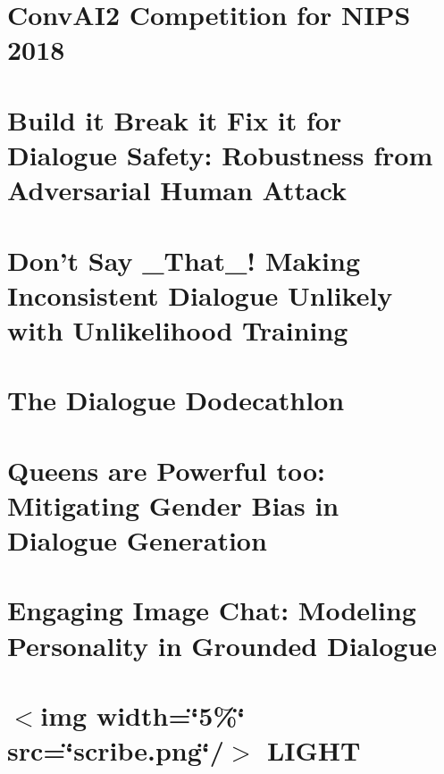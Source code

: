 \documentclass[twoside]{book}
\newcommand{\+}{\discretionary{\mbox{\scriptsize$\hookleftarrow$}}{}{}}
\begin{document}
\chapter{Conv\+A\+I2 Competition for N\+I\+PS 2018}
\label{md_projects_convai2_README}

\chapter{Build it Break it Fix it for Dialogue Safety\+: Robustness from Adversarial Human Attack}
\label{md_projects_dialogue_safety_README}

\chapter{Don’t Say \+\_\+\+That\+\_\+! Making Inconsistent Dialogue Unlikely with Unlikelihood Training}
\label{md_projects_dialogue_unlikelihood_README}

\chapter{The Dialogue Dodecathlon}
\label{md_projects_dodecadialogue_README}

\chapter{Queens are Powerful too\+: Mitigating Gender Bias in Dialogue Generation}
\label{md_projects_genderation_bias_README}

\chapter{Engaging Image Chat\+: Modeling Personality in Grounded Dialogue}
\label{md_projects_image_chat_README}

\chapter{$<$img width=\char`\"{}5\%\char`\"{} src=\char`\"{}scribe.\+png\char`\"{}/$>$ L\+I\+G\+HT}
\label{md_projects_light_README}

\end{document}
